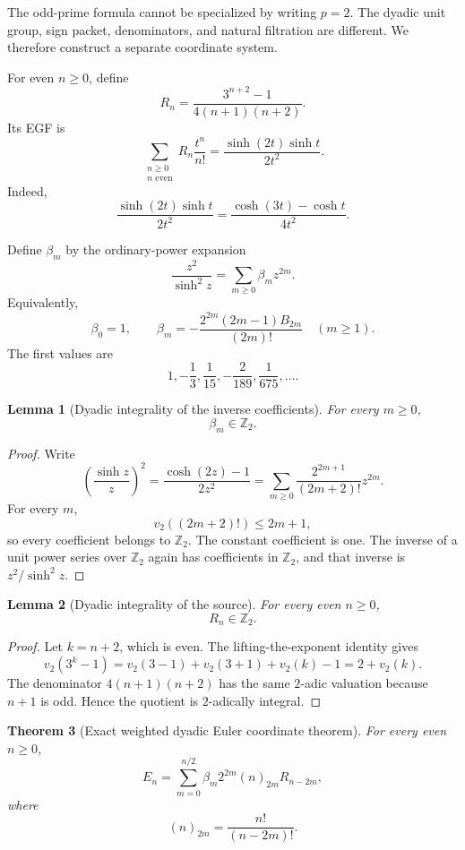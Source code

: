 \documentclass[11pt]{article}
\newtheorem{theorem}{Theorem}[section]
\newtheorem{lemma}[theorem]{Lemma}
\theoremstyle{definition}
\theoremstyle{remark}
\newcommand{\bbZ}{\mathbb Z}
\newcommand{\fall}[2]{(#1)_{#2}}
\begin{document}
The odd-prime formula cannot be specialized by writing $p=2$. The dyadic unit group, sign packet, denominators, and natural filtration are different. We therefore construct a separate coordinate system.

For even $n\ge0$, define
\[
\boxed{
R_n
=
\frac{3^{n+2}-1}{4(n+1)(n+2)}.
}
\]
Its EGF is
\[
\boxed{
\sum_{\substack{n\ge0\\n\text{ even}}}
R_n\frac{t^n}{n!}
=
\frac{\sinh(2t)\sinh t}{2t^2}.
}
\]
Indeed,
\[
\frac{\sinh(2t)\sinh t}{2t^2}
=
\frac{\cosh(3t)-\cosh t}{4t^2}.
\]

Define $\beta_m$ by the ordinary-power expansion
\[
\boxed{
\frac{z^2}{\sinh^2z}
=
\sum_{m\ge0}\beta_mz^{2m}.
}
\]
Equivalently,
\[
\beta_0=1,
\qquad
\boxed{
\beta_m
=-\frac{2^{2m}(2m-1)B_{2m}}{(2m)!}
\quad(m\ge1).
}
\]
The first values are
\[
1,-\frac13,\frac1{15},-\frac2{189},\frac1{675},\ldots.
\]

\begin{lemma}[Dyadic integrality of the inverse coefficients]
For every $m\ge0$,
\[
\boxed{\beta_m\in\bbZ_2.}
\]
\end{lemma}

\begin{proof}
Write
\[
\left(\frac{\sinh z}{z}\right)^2
=
\frac{\cosh(2z)-1}{2z^2}
=
\sum_{m\ge0}
\frac{2^{2m+1}}{(2m+2)!}z^{2m}.
\]
For every $m$,
\[
v_2((2m+2)!)\le2m+1,
\]
so every coefficient belongs to $\bbZ_2$. The constant coefficient is one. The inverse of a unit power series over $\bbZ_2$ again has coefficients in $\bbZ_2$, and that inverse is $z^2/\sinh^2z$.
\end{proof}

\begin{lemma}[Dyadic integrality of the source]
For every even $n\ge0$,
\[
\boxed{R_n\in\bbZ_2.}
\]
\end{lemma}

\begin{proof}
Let $k=n+2$, which is even. The lifting-the-exponent identity gives
\[
v_2(3^k-1)=v_2(3-1)+v_2(3+1)+v_2(k)-1=2+v_2(k).
\]
The denominator $4(n+1)(n+2)$ has the same $2$-adic valuation because $n+1$ is odd. Hence the quotient is $2$-adically integral.
\end{proof}

\begin{theorem}[Exact weighted dyadic Euler coordinate theorem]
For every even $n\ge0$,
\[
\boxed{
E_n
=
\sum_{m=0}^{n/2}
\beta_m2^{2m}
\fall{n}{2m}
R_{n-2m},
}
\]
where
\[
\fall{n}{2m}=\frac{n!}{(n-2m)!}.
\]
\end{theorem}
\end{document}
